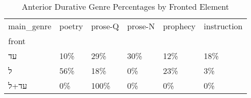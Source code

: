 \begin{table}[htbp!]
\centering
\caption{Anterior Durative Genre Percentages by Fronted Element}
\label{table:antdur_gen_pc}
\begin{tabular}{llllll}
\toprule
main\_genre & poetry & prose-Q & prose-N & prophecy & instruction \\
front &        &         &         &          &             \\
\midrule
עד    &    10\% &     29\% &     30\% &      12\% &         18\% \\
ל     &    56\% &     18\% &      0\% &      23\% &          3\% \\
עד+ל  &     0\% &    100\% &      0\% &       0\% &          0\% \\
\bottomrule
\end{tabular}
\end{table}
